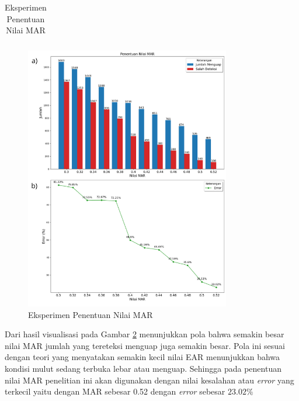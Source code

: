 \begin{table}[H]
\begin{table}[h]
\begin{tabular}{ccccc}
                    \bottomrule
                \end{tabular}
                \label{Penentuan Nilai MAR}
            \end{table}



         \begin{figure}[H]
               \centering
               \includegraphics[width=0.8\textwidth]{figures/bab4/penentuan nilai mar.png}
               \caption{Eksperimen Penentuan Nilai MAR}
               \label{Eksperimen Penentuan Nilai MAR}

         \end{figure}

        Dari hasil visualisasi pada Gambar \ref{Eksperimen Penentuan Nilai MAR} menunjukkan pola bahwa semakin besar nilai MAR jumlah yang tereteksi 
        menguap juga semakin besar. Pola ini sesuai dengan teori yang menyatakan 
        semakin kecil nilai EAR menunjukkan bahwa kondisi mulut sedang terbuka lebar atau menguap. Sehingga pada penentuan nilai MAR penelitian ini akan digunakan dengan nilai kesalahan atau \textit{error} yang terkecil yaitu dengan MAR sebesar 0.52 dengan \textit{error} sebesar $23.02\%$\\




\end{table}
